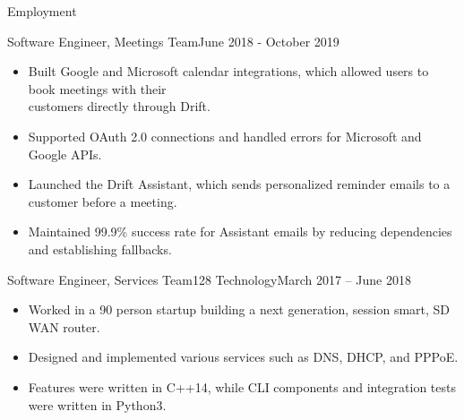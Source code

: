 \documentclass[]{mcdowellcv}
\begin{document}
\begin{cvsection}{Employment}
		\begin{cvsubsection2}{Software Engineer, \normalfont Meetings Team}{June 2018 - October 2019}		
			\begin{itemize}
				\item Built Google and Microsoft calendar integrations, which allowed users to book meetings with their \\ customers directly through Drift. 
				\item Supported OAuth 2.0 connections and handled errors for Microsoft and Google APIs.
				\item Launched the Drift Assistant, which sends personalized reminder emails to a customer before a meeting. 
				\item Maintained 99.9\% success rate for Assistant emails by reducing dependencies and establishing fallbacks.
			\end{itemize}
		\end{cvsubsection2}
		
		\begin{cvsubsection}{Software Engineer, \normalfont Services Team}{128 Technology}{March 2017 – June 2018}
			\begin{itemize}
				\item Worked in a 90 person startup building a next generation, session smart, SD WAN router.
				\item Designed and implemented various services such as DNS, DHCP, and PPPoE.
				\item Features were written in C++14, while CLI components and integration tests were written in Python3.
			\end{itemize}
		\end{cvsubsection}
	\end{cvsection}	
\end{document}

